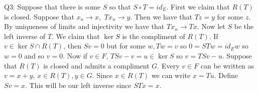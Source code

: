 \documentclass[letterpaper]{article}
\begin{document}
 \noindent Q3: Suppose that there is some $S$ so that $S\circ T = id_E$. 
First we claim that $R(T)$ is closed. Suppose that $x_n \to x,$ $Tx_n \to y$. Then we have that $Tz = y$ for some $z$. 
By uniqueness of limits and injectivity we have that $Tx_n \to Tx$. Now let $S$ be the left inverse of $T$. We claim that $\ker S$ is the compliment of 
$R(T)$. If $v\in \ker S\cap R(T)$, then $Sv = 0$ but for some $w, Tw = v$ so $0= STw = id_E w$ so $w=0$ and so $v=0$. 
Now if $v\in F$, $TSv - v = u \in \ker S $ so $v = TSv - u$. Suppose that $R(T)$ is closed and admits a compliment $G$. Every $v\in F$
can be written as $v = x+y$, $x\in R(T), y\in G$. Since $x\in R(T)$ we can write $x = Tu$. Define $Sv = x$. This will be our left inverse since $STx = x$. 
\end{document}
